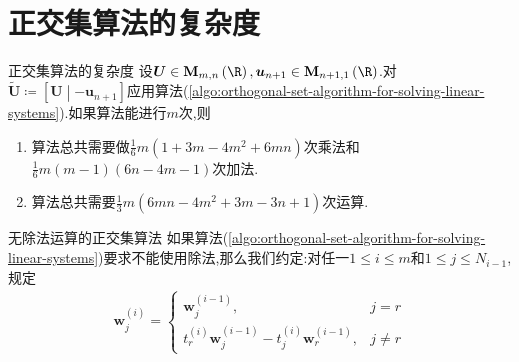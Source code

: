 \section{正交集算法的复杂度}

\begin{theorem}{正交集算法的复杂度}{}
	设$\boldsymbol{U}\in\mathbf{M}_{m,n}\left(\R\right),\boldsymbol{u}_{n+1}\in\mathbf{M}_{n+1,1}\left(\R\right)$.对$\tilde{\boldsymbol{U}}\coloneq\left[\boldsymbol{U}\middle|-\boldsymbol{u}_{n+1}\right]$应用算法(\ref{algo:orthogonal-set-algorithm-for-solving-linear-systems}).如果算法能进行$m$次,则
	\begin{enumerate}
		\item 算法总共需要做$\frac{1}{6}m\left(1+3m-4m^{2}+6mn\right)$次乘法和$\frac{1}{6}m\left(m-1\right)\left(6n-4m-1\right)$次加法.
		\item 算法总共需要$\frac{1}{3}m\left(6mn-4m^{2}+3m-3n+1\right)$次运算.
	\end{enumerate}
\end{theorem}

\begin{remark}{无除法运算的正交集算法}{}
	如果算法(\ref{algo:orthogonal-set-algorithm-for-solving-linear-systems})要求不能使用除法,那么我们约定:对任一$1\leq i\leq m$和$1\leq j\leq N_{i-1}$,规定
	\begin{align*}
		\boldsymbol{w}_{j}^{\left(i\right)}=
		\begin{cases}
			\boldsymbol{w}_{j}^{\left(i-1\right)},&j=r\\
			t_{r}^{\left(i\right)}\boldsymbol{w}_{j}^{\left(i-1\right)}-t_{j}^{\left(i\right)}\boldsymbol{w}_{r}^{\left(i-1\right)},&j\neq r
		\end{cases}
	\end{align*}
\end{remark}